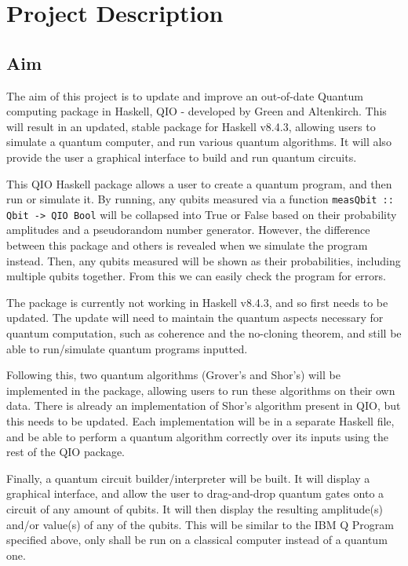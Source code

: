 \documentclass[a4paper,10pt, titlepage, twoside]{article}
\begin{document}
\section{Project Description}
\subsection{Aim}
The aim of this project is to update and improve an out-of-date Quantum computing package in Haskell, QIO \cite{qio} - developed by Green and Altenkirch. This will result in an updated, stable package for Haskell v8.4.3, allowing users to simulate a quantum computer, and run various quantum algorithms. It will also provide the user a graphical interface to build and run quantum circuits. \par
This QIO Haskell package allows a user to create a quantum program, and then run or simulate it. By running, any qubits measured via a function \texttt{measQbit :: Qbit -> QIO Bool} will be collapsed into True or False based on their probability amplitudes and a pseudorandom number generator. However, the difference between this package and others is revealed when we simulate the program instead. Then, any qubits measured will be shown as their probabilities, including multiple qubits together. From this we can easily check the program for errors.\par
The package is currently not working in Haskell v8.4.3, and so first needs to be updated. The update will need to maintain the quantum aspects necessary for quantum computation, such as coherence and the no-cloning theorem, and still be able to run/simulate quantum programs inputted. \par
Following this, two quantum algorithms (Grover's and Shor's) will be implemented in the package, allowing users to run these algorithms on their own data. There is already an implementation of Shor's algorithm present in QIO, but this needs to be updated. Each implementation will be in a separate Haskell file, and be able to perform a quantum algorithm correctly over its inputs using the rest of the QIO package.\par
Finally, a quantum circuit builder/interpreter will be built. It will display a graphical interface, and allow the user to drag-and-drop quantum gates onto a circuit of any amount of qubits. It will then display the resulting amplitude(s) and/or value(s) of any of the qubits. This will be similar to the IBM Q Program specified above, only shall be run on a classical computer instead of a quantum one.
\end{document}
